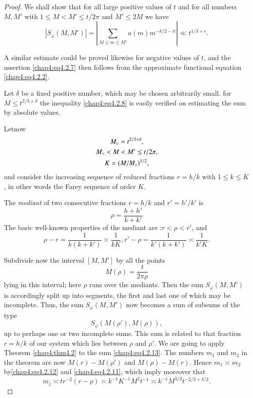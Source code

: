\begin{proof}
We shall show that for all large positive values of $t$ and for all numbers $M,M'$ with $1\leq M<M'\leq t/2\pi$ and $M'\leq 2M$ we have 
\begin{equation}\label{chap4:eq4.2.8}
\left|S_\varphi(M,M')\right|=\left|\sum\limits_{M\leq m\leq M'}a(m) m^{-k /2-it}\right|\ll t^{1/3+\epsilon}.
\end{equation}

A similar estimate could be proved likewise for negative values of $t$, and the assertion \eqref{chap4:eq4.2.7} then follows from the approximate functional equation \eqref{chap4:eq4.2.2}.

Let $\delta$ be a fixed positive number, which may be chosen arbitrarily small. for $M\leq t^{2/3+\delta}$ the inequality \eqref{chap4:eq4.2.8} is easily verified on estimating the sum by absolute values.

Let\pageoriginale now
\begin{gather}
M_\circ = t^{2/3+\delta},\notag\\
M_\circ < M < M' \leq t/2\pi,\label{chap4:eq4.2.9}\\
K= (M/M_\circ)^{1/2},\label{chap4:eq4.2.10}
\end{gather}
and consider the increasing sequence of reduced fractions $r=h/k$ with $1\leq k\leq K$, in other words the Farey sequence of order $K$.

The \emph{mediant} of two consecutive fractions $r=h/k$ and $r'=h'/k'$ is 
$$
\rho=\frac{h+h'}{k+k'}
$$
The basic well-known properties of the mediant are :$r<\rho <r'$, and 
\begin{equation}\label{chap4:eq4.2.11}
\rho-r=\frac{1}{k(k+k')}\asymp\frac{1}{kK},r'-\rho= \frac{1}{k'(k+k')} \asymp\frac{1}{k'K}.
\end{equation}

Subdivide now the interval $[M,M']$ by all the points 
\begin{equation}\label{chap4:eq4.2.12}
M(\rho)=\frac{t}{2\pi\rho}
\end{equation}
lying in this interval; here $\rho$ runs over the mediants. Then the sum $S_\varphi(M,M')$ is accordingly split up into segments, the first and last one of which may be incomplete. Thus, the sum $S_\varphi(M,M')$ now becomes a sum of subsums of the type
\begin{equation}\label{chap4:eq4.2.13}
S_\varphi(M(\rho'),M(\rho)),
\end{equation}
up to perhaps one or two incomplete sums. This sum is related to that fraction $r=h/k$ of our system which lies between $\rho$ and $\rho'$. We are going to apply Theorem \ref{chap4:thm4.2} to the sum \eqref{chap4:eq4.2.13}. The numbers $m_1$ and $m_2$ in the theorem are now $M(r)-M(\rho')$ and $M(\rho)-M(r)$. Hence $m_1\asymp m_2$ by\pageoriginale \eqref{chap4:eq4.2.12} and \eqref{chap4:eq4.2.11}, which imply moreover that 
\begin{equation}\label{chap4:eq4.2.14}
m_j\asymp tr^{-2}(r-\rho)\asymp k^{-1}K^{-1}M^2 t^{-1}\asymp k^{-1}M^{3/2} t^{-2/3+\delta/2}.
\end{equation}


\end{proof}

